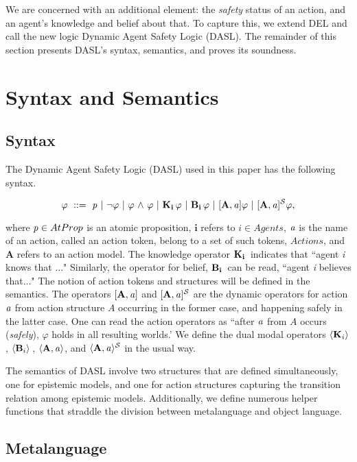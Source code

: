 We are concerned with an additional element: the \emph{safety} status of an action, and an agent's knowledge and belief about that. To capture this, we extend DEL and call the new logic Dynamic Agent Safety Logic (DASL). The remainder of this section presents DASL's syntax, semantics, and proves its soundness. 
\section{Syntax and Semantics}
\subsection{Syntax}
The Dynamic Agent Safety Logic (DASL) used in this paper has the following syntax.
\begin{tcolorbox}
	$$ \varphi \ ::=\   \mathit{p}  \ |\  {\neg} \varphi \ |\  \varphi {\ \wedge \ } \varphi  \ |\  \mathbf{K}_{\mathbf{i}}\, \varphi \ |\  \mathbf{B}_{\mathbf{i}}\,\varphi \ |\  \mathbf{[A,\mathit{a}]}\varphi \ |\ \mathbf{[A,\mathit{a}]^\mathcal{S}}\varphi,$$
\end{tcolorbox}
where $\mathit{p} \in AtProp$ is an atomic proposition, $\mathbf{i}$ refers to $i \in Agents$, $\mathbf{\mathit{a}}$ is the name of an action, called an action token, belong to a set of such tokens, $Actions$, and $\mathbf{A}$ refers to an action model. The knowledge operator $\mathbf{K}_{\mathbf{i}}\,$ indicates that ``agent \emph{i} knows that ..." Similarly, the operator for belief, $\mathbf{B}_{\mathbf{i}}\,$ can be read, ``agent \emph{i} believes that..." The notion of action tokens and structures will be defined in the semantics. The operators $\mathbf{[A,\mathit{a}]}$ and $\mathbf{[A,\mathit{a}]^\mathcal{S}}$ are the dynamic operators for action $\mathit{a}$ from action structure $A$ occurring in the former case, and happening safely in the latter case. One can read the action operators as ``after $\mathit{a}$ from $A$ occurs (\emph{safely}), $\varphi$ holds in all resulting worlds.' We define the dual modal operators $\langle \mathbf{K}_{i} \rangle\,$, $\langle \mathbf{B}_{i} \rangle\,$, $\mathbf{\langle A,\mathit{a}\rangle}$, and $\mathbf{\langle A,\mathit{a}\rangle^\mathcal{S}}$ in the usual way. 

The semantics of DASL involve two structures that are defined simultaneously, one for epistemic models, and one for action structures capturing the transition relation among epistemic models. Additionally, we define numerous helper functions that straddle the division between metalanguage and object language. 

\subsection{Metalanguage}

